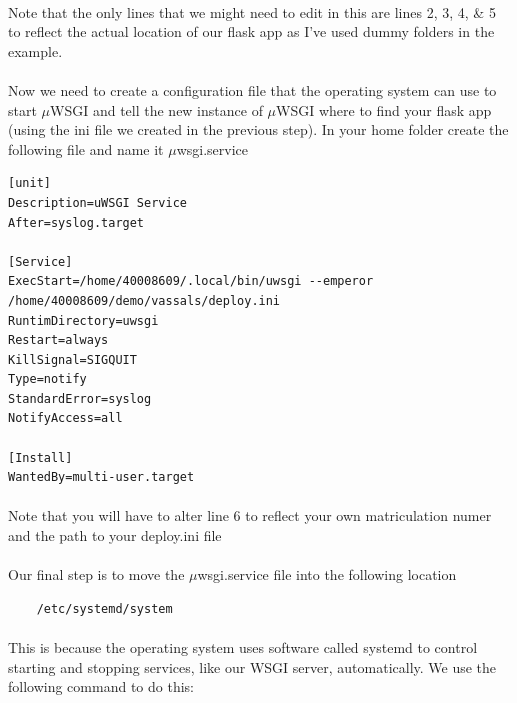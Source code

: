 \documentclass[12pt, a4paper, oneside]{book}
\begin{document}
{\paragraph{} Note that the only lines that we might need to edit in this are lines 2, 3, 4, \& 5 to reflect the actual location of our flask app as I've used dummy folders in the example.

\paragraph{} Now we need to create a configuration file that the operating system can use to start $\mu$WSGI and tell the new instance of $\mu$WSGI where to find your flask app (using the ini file we created in the previous step). In your home folder create the following file and name it $\mu$wsgi.service

\begin{lstlisting}
[unit]
Description=uWSGI Service
After=syslog.target

[Service]
ExecStart=/home/40008609/.local/bin/uwsgi --emperor /home/40008609/demo/vassals/deploy.ini
RuntimDirectory=uwsgi
Restart=always
KillSignal=SIGQUIT
Type=notify
StandardError=syslog
NotifyAccess=all

[Install]
WantedBy=multi-user.target
\end{lstlisting}

\paragraph{} Note that you will have to alter line 6 to reflect your own matriculation numer and the path to your deploy.ini file

\paragraph{} Our final step is to move the $\mu$wsgi.service file into the following location

\begin{lstlisting}
    /etc/systemd/system
\end{lstlisting}

\paragraph{} This is because the operating system uses software called systemd to control starting and stopping services, like our WSGI server, automatically. We use the following command to do this:

}
\end{document}
